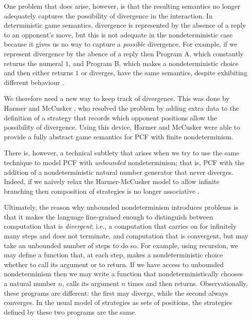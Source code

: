\documentclass{entcs} \usepackage{prentcsmacro}
\newcommand{\0}{{\mathtt{0}}}
\begin{document}
One problem that does arise, however, is that the resulting semantics no longer adequately captures the possibility of divergence in the interaction.  In deterministic game semantics, divergence is represented by the absence of a reply to an opponent's move, but this is not adequate in the nondeterministic case because it gives us no way to capture a \emph{possible} divergence.  For example, if we represent divergence by the abence of a reply then Program A, which constantly returns the numeral $1$, and Program B, which makes a nondeterministic choice and then either returns $1$ or diverges, have the same semantics, despite exhibiting different behaviour \cite{mcCHFiniteND}.

We therefore need a new way to keep track of divergence.  This was done by Harmer and McCusker \cite{mcCHFiniteND}, who resolved the problem by adding extra data to the definition of a strategy that records which opponent positions allow the possibility of divergence.  Using this device, Harmer and McCusker were able to provide a fully abstract game semantics for PCF with finite nondeterminism.

There is, however, a technical subtlety that arises when we try to use the same technique to model PCF with \emph{unbounded} nondeterminism; that is, PCF with the addition of a nondeterministic natural number generator that never diverges.  Indeed, if we naively relax the Harmer-McCusker model to allow infinite branching then composition of strategies is no longer associative \cite{RusssThesis}.  

Ultimately, the reason why unbounded nondeterminism introduces problems is that it makes the language fine-grained enough to distinguish between computation that is \emph{divergent}; i.e., a computation that carries on for infinitely many steps and does not terminate, and computation that is convergent, but may take an unbounded number of steps to do so.  For example, using recursion, we may define a function that, at each step, makes a nondeterministic choice whether to call its argument or to return.  If we have access to unbounded nondeterminism then we may write a function that nondeterministically chooses a natural number $n$, calls its argument $n$ times and then returns.  Observationally, these programs are different: the first may diverge, while the second always converges.  In the usual model of strategies as sets of positions, the strategies defined by these two programs are the same.  
\end{document}
